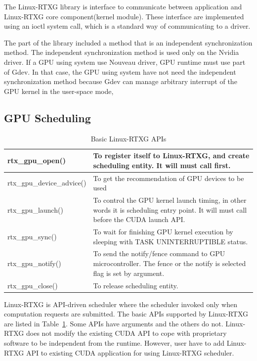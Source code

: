 The Linux-RTXG library is interface to communicate between application and Linux-RTXG core component(kernel module).
These interface are implemented using an ioctl system call, which is a standard way of communicating to a driver.

The part of the library included a method that is an independent synchronization method.
The independent synchronization method is used only on the Nvidia driver.
If a GPU using system use Nouveau driver\cite{nouveau}, GPU runtime must use part of Gdev.
In that case, the GPU using system have not need the independent synchronization method because Gdev can manage arbitrary interrupt of the GPU kernel in the user-space mode,

\subsection{GPU Scheduling}
\begin{table}[t]
\begin{center}
\caption{Basic Linux-RTXG APIs}
\label{tab:rtx-api}
\begin{tabular}{|l|p{50em}|} \hline
rtx\_gpu\_open() & To register itself to Linux-RTXG, and create scheduling entity. It will must call first. \\ \hline
rtx\_gpu\_device\_advice() & To get the recommendation of GPU devices to be used \\ \hline
rtx\_gpu\_launch() & To control the GPU kernel launch timing, in other words it is scheduling entry point. It will must call before the CUDA launch API. \\ \hline
rtx\_gpu\_sync() & To wait for finishing GPU kernel execution by sleeping with TASK UNINTERRUPTIBLE status.\\ \hline
rtx\_gpu\_notify() & To send the notify/fence command to GPU microcontroller. The fence or the notify is selected flag is set by argument.\\ \hline
rtx\_gpu\_close() & To release scheduling entity.\\ \hline
\end{tabular}
\end{center}
\end{table}

Linux-RTXG is API-driven scheduler where the scheduler invoked only when computation requests are submitted.
The basic APIs supported by Linux-RTXG are listed in Table~\ref{tab:rtx-api}.
Some APIs have arguments and the others do not.
Linux-RTXG does not modify the existing CUDA API to cope with proprietary software to be independent from the runtime.
However, user have to add Linux-RTXG API to existing CUDA application for using Linux-RTXG scheduler.

